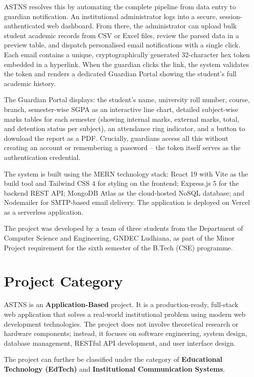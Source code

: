 \documentclass[12pt,a4paper]{report}
\begin{document}
ASTNS resolves this by automating the complete pipeline from data entry to guardian notification. An institutional administrator logs into a secure, session-authenticated web dashboard. From there, the administrator can upload bulk student academic records from CSV or Excel files, review the parsed data in a preview table, and dispatch personalised email notifications with a single click. Each email contains a unique, cryptographically generated 32-character hex token embedded in a hyperlink. When the guardian clicks the link, the system validates the token and renders a dedicated Guardian Portal showing the student's full academic history.

The Guardian Portal displays: the student's name, university roll number, course, branch, semester-wise SGPA as an interactive line chart, detailed subject-wise marks tables for each semester (showing internal marks, external marks, total, and detention status per subject), an attendance ring indicator, and a button to download the report as a PDF. Crucially, guardians access all this without creating an account or remembering a password -- the token itself serves as the authentication credential.

The system is built using the MERN technology stack: React 19 with Vite as the build tool and Tailwind CSS 4 for styling on the frontend; Express.js 5 for the backend REST API; MongoDB Atlas as the cloud-hosted NoSQL database; and Nodemailer for SMTP-based email delivery. The application is deployed on Vercel as a serverless application.

The project was developed by a team of three students from the Department of Computer Science and Engineering, GNDEC Ludhiana, as part of the Minor Project requirement for the sixth semester of the B.Tech (CSE) programme.

\section{Project Category}
ASTNS is an \textbf{Application-Based} project. It is a production-ready, full-stack web application that solves a real-world institutional problem using modern web development technologies. The project does not involve theoretical research or hardware components; instead, it focuses on software engineering, system design, database management, RESTful API development, and user interface design.

The project can further be classified under the category of \textbf{Educational Technology (EdTech)} and \textbf{Institutional Communication Systems}.
\end{document}
